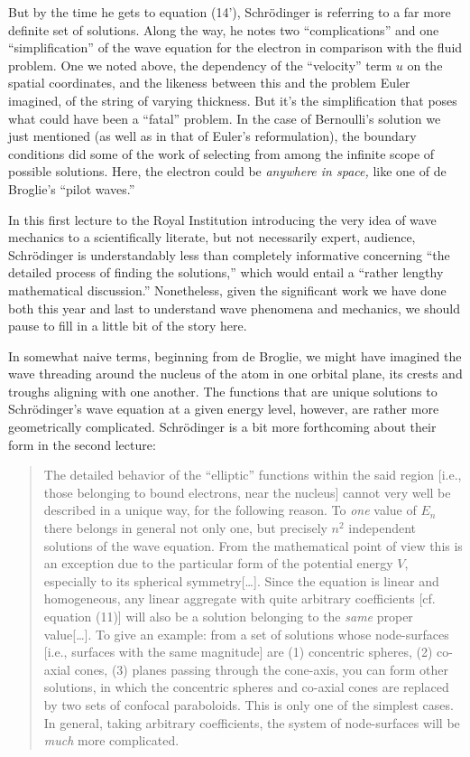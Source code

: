 But by the time he gets to equation (14'), Schrödinger is referring to a far more definite set
of solutions. Along the way, he notes two ``complications'' and one ``simplification'' of the
wave equation for the electron in comparison with the fluid problem. One we noted above, the
dependency of the ``velocity'' term $u$ on the spatial coordinates, and the likeness between
this and the problem Euler imagined, of the string of varying thickness. But it's the simplification
that poses what could have been a ``fatal'' problem. In the case of Bernoulli's solution we just
mentioned (as well as in that of Euler's reformulation), the boundary conditions did some of the
work of selecting from among the infinite scope of possible solutions. Here, the electron could
be \emph{anywhere in space,} like one of de Broglie's ``pilot waves.''

In this first lecture to the Royal Institution introducing the very idea of wave mechanics to
a scientifically literate, but not necessarily expert, audience, Schrödinger is understandably
less than completely informative concerning ``the detailed process of finding the solutions,'' 
which would entail a ``rather lengthy mathematical discussion.'' Nonetheless, given the significant
work we have done both this year and last to understand wave phenomena and mechanics, we should
pause to fill in a little bit of the story here.

In somewhat naive terms, beginning from de Broglie, we might have imagined the wave threading
around the nucleus of the atom in one orbital plane, its crests and troughs aligning with one 
another. The functions that are unique solutions to Schrödinger's wave equation at a given energy level,
however, are rather more geometrically complicated. Schrödinger is a bit more forthcoming about
their form in the second lecture:

\begin{quote}
The detailed behavior of the ``elliptic'' functions within the said region [i.e., those belonging
to bound electrons, near the nucleus] cannot very well be described in a unique way, for the
following reason. To \emph{one} value of $E_n$ there belongs in general not only one, but 
precisely $n^2$ independent solutions of the wave equation. From the mathematical point of
view this is an exception due to the particular form of the potential energy $V$, especially to
its spherical symmetry[\ldots]. Since the equation is linear and homogeneous, any linear aggregate
with quite arbitrary coefficients [cf. equation (11)] will also be a solution belonging to the
\emph{same} proper value[\ldots]. To give an example: from a set of solutions whose node-surfaces
[i.e., surfaces with the same magnitude] are (1) concentric spheres, (2) co-axial cones, (3)
planes passing through the cone-axis, you can form other solutions, in which the concentric
spheres and co-axial cones are replaced by two sets of confocal paraboloids. This is only one
of the simplest cases. In general, taking arbitrary coefficients, the system of node-surfaces
will be \emph{much} more complicated.
\end{quote}

